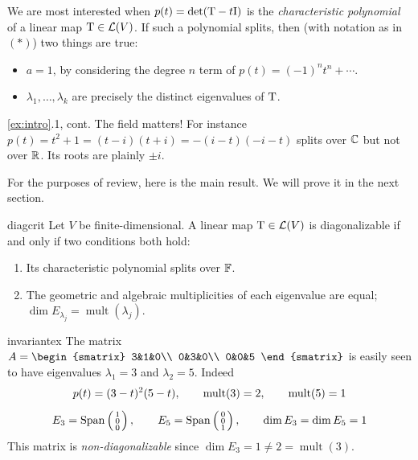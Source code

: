 We are most interested when $p(t)=\det(\mathrm{T}-t\mathrm{I})$ is the \emph{characteristic polynomial} of a linear map $\mathrm{T}\in\mathcal{L}(V)$. If such a polynomial splits, then (with notation as in $(\ast)$) two things are true:
\begin{itemize}
  \item $a=1$, by considering the degree $n$ term of $p(t)=(-1)^nt^n+\cdots$.
  \item $\lambda_1,\ldots,\lambda_k$ are precisely the distinct eigenvalues of $\mathrm{T}$.
\end{itemize}

\begin{example*}{\ref{ex:intro}.1, cont.}{}
	The field matters! For instance $p(t)=t^2+1=(t-i)(t+i)=-(i-t)(-i-t)$ splits over $\mathbb{C}$ but not over $\mathbb{R}$. Its roots are plainly $\pm i$.
\end{example*}

For the purposes of review, here is the main result. We will prove it in the next section.

\begin{thm}{}{diagcrit}
	Let $V$ be finite-dimensional. A linear map $\mathrm{T}\in\mathcal{L}(V)$ is diagonalizable if and only if two conditions both hold:
	\begin{enumerate}
	  \item Its characteristic polynomial splits over $\mathbb{F}$.
	  \item The geometric and algebraic multiplicities of each eigenvalue are equal; $\dim E_{\lambda_j}=\operatorname{mult}(\lambda_j)$.
	\end{enumerate}
\end{thm}

\begin{example}{}{invariantex}
	The matrix $A=
	\begin{smatrix}
		3&1&0\\
		0&3&0\\
		0&0&5
	\end{smatrix}$
	is easily seen to have eigenvalues $\lambda_1=3$ and $\lambda_2=5$. Indeed
	\begin{gather*}
		p(t)=(3-t)^2(5-t),\qquad \operatorname{mult}(3)=2,\qquad \operatorname{mult}(5)=1\\[5pt]
		E_3=\operatorname{Span}\left(\begin{smallmatrix}1\\0\\0\end{smallmatrix}\right),\qquad E_5=\operatorname{Span}\left(\begin{smallmatrix}0\\0\\1\end{smallmatrix}\right),\qquad \dim E_3=\dim E_5=1
	\end{gather*}
	This matrix is \emph{non-diagonalizable} since $\dim E_3=1\neq 2=\operatorname{mult}(3)$.
\end{example}

\bigskip

